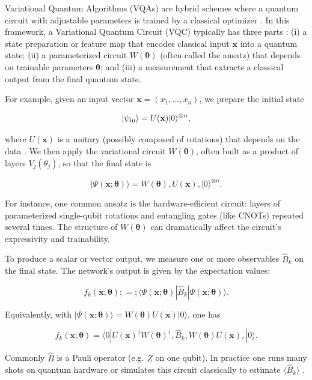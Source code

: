 Variational Quantum Algorithms (VQAs) are hybrid schemes where a quantum circuit with adjustable parameters is trained by a classical optimizer .  In this framework, a Variational Quantum Circuit (VQC) typically has three parts : (i) a state preparation or feature map that encodes classical input $\mathbf{x}$ into a quantum state; (ii) a parameterized circuit $W(\boldsymbol\theta)$ (often called the ansatz) that depends on trainable parameters $\boldsymbol\theta$; and (iii) a measurement that extracts a classical output from the final quantum state.



For example, given an input vector $\mathbf{x}=(x_1,\dots,x_n)$, we prepare the initial state

$$|\psi_{\rm in}\rangle = U(\mathbf{x})|0\rangle^{\otimes n},$$

where $U(\mathbf{x})$ is a unitary (possibly composed of rotations) that depends on the data .  We then apply the variational circuit $W(\boldsymbol\theta)$, often built as a product of layers $V_j(\theta_j)$, so that the final state is

$$|\Psi(\mathbf{x};\boldsymbol\theta)\rangle = W(\boldsymbol\theta),U(\mathbf{x}),|0\rangle^{\otimes n}.$$

For instance, one common ansatz is the hardware-efficient circuit: layers of parameterized single-qubit rotations and entangling gates (like CNOTs) repeated several times.  The structure of $W(\boldsymbol\theta)$ can dramatically affect the circuit’s expressivity and trainability.



To produce a scalar or vector output, we measure one or more observables $\hat B_k$ on the final state.  The network’s output is given by the expectation values:

$$f_k(\mathbf{x};\boldsymbol\theta) ;=; \langle \Psi(\mathbf{x};\boldsymbol\theta) | \hat B_k | \Psi(\mathbf{x};\boldsymbol\theta)\rangle.$$

Equivalently, with $|\Psi(\mathbf{x};\boldsymbol\theta)\rangle = W(\boldsymbol\theta)U(\mathbf{x})|0\rangle$, one has

$$f_k(\mathbf{x};\boldsymbol\theta) = \langle 0|U(\mathbf{x})^\dagger W(\boldsymbol\theta)^\dagger ,\hat B_k, W(\boldsymbol\theta) U(\mathbf{x}),|0\rangle.$$

Commonly $\hat B$ is a Pauli operator (e.g. $Z$ on one qubit).  In practice one runs many shots on quantum hardware or simulates this circuit classically to estimate $\langle \hat B_k\rangle$ .



